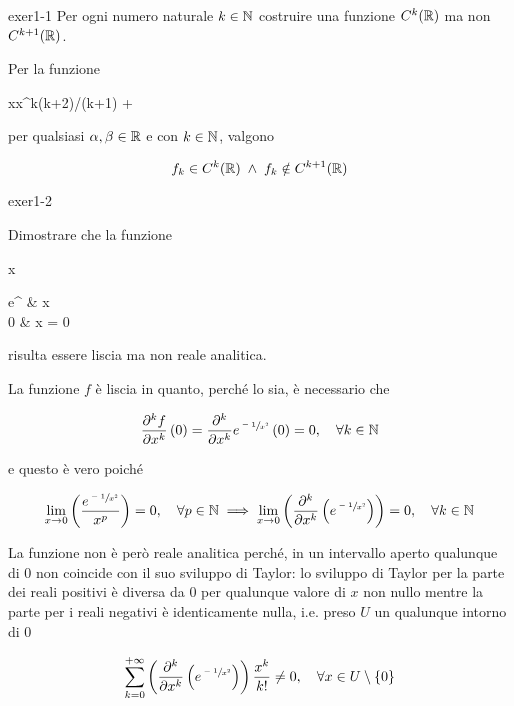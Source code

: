 {exer1-1}
{%
Per ogni numero naturale $ k \in \mathbb{N} $ costruire una funzione $ C^{k}(\mathbb{R}) $ ma non $ C^{k+1}(\mathbb{R}) $. %
}
{
Per la funzione

	{\R}{\R}
	{x}{\alpha x^{k(k+2)/(k+1)} + \beta}

per qualsiasi $ \alpha,\beta \in \mathbb{R} $ e con $ k \in \mathbb{N} $, valgono

\begin{equation}
	f_{k} \in C^{k}(\mathbb{R}) \; \wedge \; f_{k} \notin C^{k+1}(\mathbb{R})
\end{equation}
}


{exer1-2}
{
Dimostrare che la funzione

	{\R}{\R}
	{x}{%
		\begin{cases}
			e^{} & x  \\
			0 & x = 0
		\end{cases}
	}

risulta essere liscia ma non reale analitica.
}
{
La funzione $ f $ è liscia in quanto, perché lo sia, è necessario che

\begin{equation}
	\pdv[k]{f}{x} \, (0) = \pdv[k]{x} e^{\sfrac{-1}{x^{2}}} \, (0) = 0 %
	\qcomma \forall k \in \N
\end{equation}

e questo è vero poiché

\begin{equation}
	\lim_{x \to 0} \left( \dfrac{e^{\sfrac{-1}{x^{2}}}}{x^{p}} \right) = 0 \qcomma \forall p \in \N %
	\implies %
	\lim_{x \to 0} \left( \pdv[k]{x} \left( e^{\sfrac{-1}{x^{2}}} \right) \right) = 0 \qcomma \forall k \in \N
\end{equation}

La funzione non è però reale analitica perché, in un intervallo aperto qualunque di 0 non coincide con il suo sviluppo di Taylor: lo sviluppo di Taylor per la parte dei reali positivi è diversa da 0 per qualunque valore di $ x $ non nullo mentre la parte per i reali negativi è identicamente nulla, i.e. preso $ U $ un qualunque intorno di 0

\begin{equation}
	\sum_{k=0}^{+\infty} \left( \pdv[k]{x} \left( e^{\sfrac{-1}{x^{2}}} \right) \right) \dfrac{x^{k}}{k!} \neq 0 \qcomma \forall x \in U \setminus \{0\}
\end{equation}
}

